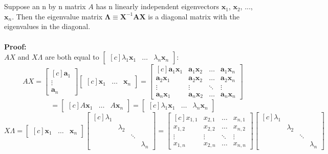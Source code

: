 \documentclass{tufte-handout}
\begin{document}
\\\leavevmode\\
\noindent Suppose an n by n matrix $A$ has n linearly independent eigenvectors $\mathbf{x}_1$, $\mathbf{x}_2$, ..., $\mathbf{x}_n$. Then the eigenvalue matrix $\mathbf{\Lambda}\equiv\mathbf{X}^{-1}\mathbf{A}\mathbf{X}$ is a diagonal matrix with the eigenvalues in the diagonal.\\\leavevmode\\
\noindent\textbf{Proof:}\\
\noindent $AX$ and $X\Lambda$ are both equal to $\begin{bmatrix*}[c]
\lambda_1\mathbf{x}_1&\dots&\lambda_n\mathbf{x}_n
\end{bmatrix*}$:
\[
AX=
\begin{bmatrix*}[c]
\mathbf{a}_1\\ \vdots \\ \mathbf{a}_n
\end{bmatrix*}
\begin{bmatrix*}[c]
\mathbf{x}_1&\dots&\mathbf{x}_n
\end{bmatrix*}
=
\begin{bmatrix*}[c]
\mathbf{a}_1\mathbf{x}_1&\mathbf{a}_1\mathbf{x}_2&\dots&\mathbf{a}_1\mathbf{x}_n\\
\mathbf{a}_2\mathbf{x}_1&\mathbf{a}_2\mathbf{x}_2&\dots&\mathbf{a}_2\mathbf{x}_n\\
\vdots&\vdots&\ddots&\vdots\\
\mathbf{a}_n\mathbf{x}_1&\mathbf{a}_n\mathbf{x}_2&\dots&\mathbf{a}_n\mathbf{x}_n
\end{bmatrix*}
\]
\[
=
\begin{bmatrix*}[c]
A\mathbf{x}_1&\dots&A\mathbf{x}_n
\end{bmatrix*}
=
\begin{bmatrix*}[c]
\lambda_1\mathbf{x}_1&\dots&\lambda_n\mathbf{x}_n
\end{bmatrix*}
\]
\[
X\Lambda=
\begin{bmatrix*}[c]
\mathbf{x}_1&\dots&\mathbf{x}_n
\end{bmatrix*}
\begin{bmatrix*}[c]
\lambda_1&&&\\
&\lambda_2&&\\
&&\ddots&\\
&&&\lambda_n
\end{bmatrix*}
=
\begin{bmatrix*}[c]
x_{1,1}&x_{2,1}&\dots&x_{n,1}\\
x_{1,2}&x_{2,2}&\dots&x_{n,2}\\
\vdots&\vdots&\ddots&\vdots\\
x_{1,n}&x_{2,n}&\dots&x_{n,n}
\end{bmatrix*}
\begin{bmatrix*}[c]
\lambda_1&&&\\
&\lambda_2&&\\
&&\ddots&\\
&&&\lambda_n
\end{bmatrix*}
\]
\end{document}
